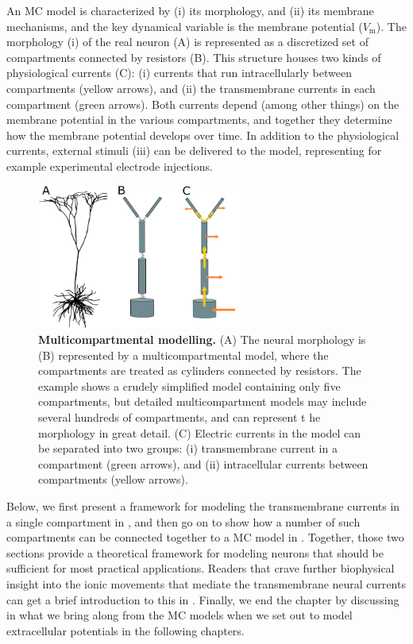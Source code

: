 An MC model is characterized by (i) its morphology, and (ii) its membrane mechanisms, and the key dynamical variable is the membrane potential ($V_\mathrm{m}$). The morphology (i) of the real neuron (A) is represented as a discretized set of compartments connected by resistors (B). This structure houses two kinds of physiological currents (C): (i) currents that run intracellularly between compartments (yellow arrows), and (ii) the transmembrane currents in each compartment (green arrows). Both currents depend (among other things) on the membrane potential in the various compartments, and together they determine how the membrane potential develops over time. In addition to the physiological currents, external stimuli (iii) can be delivered to the model, representing for example experimental electrode injections. 


\begin{figure}[!ht]
\begin{center}
\includegraphics[width=0.6\textwidth]{Figures/Neuron/multicompartment.png}
\end{center}
\caption{\textbf{Multicompartmental modelling.}  (A) The neural morphology is (B) represented by a multicompartmental model, where the compartments are treated as cylinders connected by resistors. The example shows a crudely simplified model containing only five compartments, but detailed multicompartment models may include several hundreds of compartments, and can represent t he morphology in great detail. (C) Electric currents in the model can be separated into two groups: (i) transmembrane current in a compartment (green arrows), and (ii) intracellular currents between compartments (yellow arrows). 
}
\label{fig:Neuron:multicomp}
\end{figure}

Below, we first present a framework for modeling the transmembrane currents in a single compartment in , and then go on to show how a number of such compartments can be connected together to a MC model in . Together, those two sections provide a theoretical framework for modeling neurons\sntxt{,} that should be sufficient for most practical applications. Readers that crave further biophysical insight into the ionic movements that mediate the transmembrane neural currents can get a brief introduction to this in . Finally, we end the chapter by discussing in  what we bring along from the MC models when we set out to model extracellular potentials in the following chapters. 


